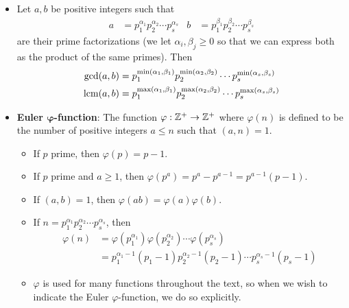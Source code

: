 \documentclass[../notes.tex]{subfiles}
\begin{document}
\begin{itemize}
\begin{itemize}
    \end{itemize}
    \item Let $a,b$ be positive integers such that
    \begin{align*}
        a &= p_1^{\alpha_1}p_2^{\alpha_2}\cdots p_s^{\alpha_s}&
        b &= p_1^{\beta_1}p_2^{\beta_2}\cdots p_s^{\beta_s}
    \end{align*}
    are their prime factorizations (we let $\alpha_i,\beta_j\geq 0$ so that we can express both as the product of the same primes). Then
    \begin{align*}
        \gcd(a,b) &= p_1^{\min(\alpha_1,\beta_1)}p_2^{\min(\alpha_2,\beta_2)}\cdots p_s^{\min(\alpha_s,\beta_s)}\\
        \operatorname{lcm}(a,b) &= p_1^{\max(\alpha_1,\beta_1)}p_2^{\max(\alpha_2,\beta_2)}\cdots p_s^{\max(\alpha_s,\beta_s)}
    \end{align*}
    \item \textbf{Euler $\bm{\varphi}$-function}: The function $\varphi:\mathbb{Z}^+\to\mathbb{Z}^+$ where $\varphi(n)$ is defined to be the number of positive integers $a\leq n$ such that $(a,n)=1$.
    \begin{itemize}
        \item If $p$ prime, then $\varphi(p)=p-1$.
        \item If $p$ prime and $a\geq 1$, then $\varphi(p^a)=p^a-p^{a-1}=p^{a-1}(p-1)$.
        \item If $(a,b)=1$, then $\varphi(ab)=\varphi(a)\varphi(b)$.
        \item If $n=p_1^{\alpha_1}p_2^{\alpha_2}\cdots p_s^{\alpha_s}$, then
        \begin{align*}
            \varphi(n) &= \varphi(p_1^{\alpha_1})\varphi(p_2^{\alpha_2})\cdots\varphi(p_s^{\alpha_s})\\
            &= p_1^{\alpha_1-1}(p_1-1)p_2^{\alpha_2-1}(p_2-1)\cdots p_s^{\alpha_s-1}(p_s-1)
        \end{align*}
        \item $\varphi$ is used for many functions throughout the text, so when we wish to indicate the Euler $\varphi$-function, we do so explicitly.
    \end{itemize}
\end{itemize}
\end{document}
